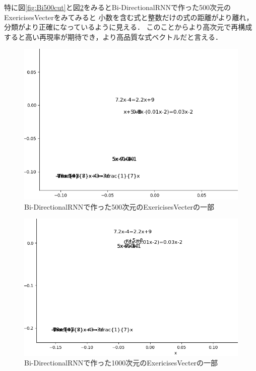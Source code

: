\documentclass[a4j,11pt,report]{jsbook}
\begin{document}
特に図\ref{fig:Bi500cut}と図\ref{fig:Bi1000cut}をみるとBi-DirectionalRNNで作った500次元のExericisesVecterをみてみると
小数を含む式と整数だけの式の距離がより離れ，分類がより正確になっているように見える．
このことからより高次元で再構成すると高い再現率が期待でき，より高品質な式ベクトルだと言える．

\begin{center}
  \begin{figure}[H]
    \centering
    \includegraphics[width=\linewidth]{image/detial/pca_formula_Bi_final_22x500_1_cut.png}
    \caption{Bi-DirectionalRNNで作った500次元のExericisesVecterの一部}
    \label{fig:Bi500cut2}
  \end{figure}
\end{center}


\begin{center}
  \begin{figure}[H]
    \centering
    \includegraphics[width=\linewidth]{image/detial/pca_formula_Bi_final_22x1000_1_cut0.png}
    \caption{Bi-DirectionalRNNで作った1000次元のExericisesVecterの一部}
    \label{fig:Bi1000cut}
  \end{figure}
\end{center}
\end{document}

